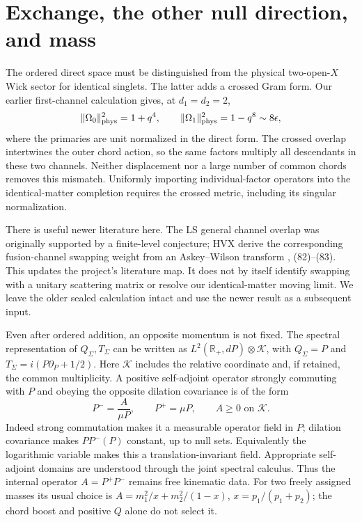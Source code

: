 \documentclass[11pt]{article}
\newcommand{\eps}{\epsilon}
\begin{document}
\newpage
\section{Exchange, the other null direction, and mass}
The ordered direct space must be distinguished from the physical
two-open-$X$ Wick sector for identical singlets. The latter adds
a crossed Gram form. Our earlier first-channel calculation gives,
at $d_1=d_2=2$,
\begin{equation}
 \|\Omega_0\|_{\rm phys}^2=1+q^4,\qquad
 \|\Omega_1\|_{\rm phys}^2=1-q^8\sim8\eps,
 \label{physical}
\end{equation}
where the primaries are unit normalized in the direct form.
The crossed overlap intertwines the outer chord action, so the
same factors multiply all descendants in these two channels.
Neither displacement nor a large number of common chords
removes this mismatch. Uniformly importing individual-factor
operators into the identical-matter completion requires the
crossed metric, including its singular normalization.

There is useful newer literature here. The LS general channel
overlap was originally supported by a finite-level conjecture;
HVX derive the corresponding fusion-channel swapping weight
from an Askey--Wilson transform \cite{HVX}, (82)--(83).
This updates the project's literature map. It does not by itself
identify swapping with a unitary scattering matrix or resolve
our identical-matter moving limit. We leave the older sealed
calculation intact and use the newer result as a subsequent input.

Even after ordered addition, an opposite momentum is not fixed.
The spectral representation of $Q_\Sigma,T_\Sigma$ can be written
as $L^2(\mathbb R_+,dP)\otimes\mathcal K$, with
$Q_\Sigma=P$ and $T_\Sigma=i(P\partial_P+1/2)$.
Here $\mathcal K$ includes the relative coordinate and, if retained,
the common multiplicity. A positive self-adjoint operator
strongly commuting with $P$ and obeying the opposite dilation
covariance is of the form
\begin{equation}
 P^- = \frac{A}{\mu P},\qquad P^+=\mu P,\qquad A\ge0
 \text{ on }\mathcal K.\label{mass}
\end{equation}
Indeed strong commutation makes it a measurable operator field
in $P$; dilation covariance makes $P P^-(P)$ constant, up to
null sets. Equivalently the logarithmic variable makes this a
translation-invariant field. Appropriate self-adjoint domains
are understood through the joint spectral calculus.
Thus the internal operator $A=P^+P^-$ remains free kinematic data.
For two freely assigned masses its usual choice is
$A=m_1^2/x+m_2^2/(1-x)$, $x=p_1/(p_1+p_2)$;
the chord boost and positive $Q$ alone do not select it.
\end{document}
